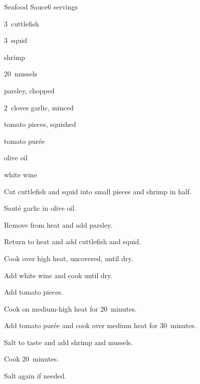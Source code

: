 \begin{recipe}{Seafood Sauce}{}{6 servings}

\begin{ingredients}
\item 3~cuttlefish
\item 3~squid
\item \lbs{\half} shrimp
\item 20~mussels
\item \C{\half} parsley, chopped
\item 2~cloves garlic, minced
\item {} tomato pieces, squished
\item {} tomato pur\'ee
\item \C{\half} olive oil
\item {} white wine
\end{ingredients}

\begin{directions}
\item Cut cuttlefish and squid into small pieces and shrimp in half.
\item Saut\'e garlic in olive oil.
\item Remove from heat and add parsley.
\item Return to heat and add cuttlefish and squid.
\item Cook over high heat, uncovered, until dry.
\item Add white wine and cook until dry.
\item Add tomato pieces.
\item Cook on medium-high heat for 20~minutes.
\item Add tomato pur\'ee and cook over medium heat for 30~minutes.
\item Salt to taste and add shrimp and mussels.
\item Cook 20~minutes.
\item Salt again if needed.
\end{directions}

\end{recipe}
